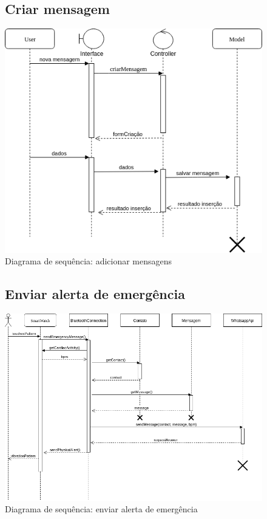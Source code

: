 \documentclass[
	12pt,				%
	openright,			%
	oneside,			%
	a4paper,			%
	english,			%
	french,				%
	spanish,			%
	brazil				%
]{abntex2}
\begin{document}
%
\begin{figure}	
	\label{figure_diagrama_sequencia_criar_mensagem}
	\subsection{Criar mensagem}	
	\includegraphics[scale=0.6]{SequenceMensagens/CriarMensagemSequence.png}
	\caption{Diagrama de sequência: adicionar mensagens}
	\hfill
\end{figure}
%
\begin{figure}[h]	
	\label{figure_diagrama_sequencia_enviar_alerta_emergencia}
	\subsection{Enviar alerta de emergência}
	\caption{ Diagrama de sequência: enviar alerta de emergência }
	\includegraphics[scale=0.6]{SequenceSmartwatch/Send_Alert.png}
	\hfill
\end{figure}
\end{document}
